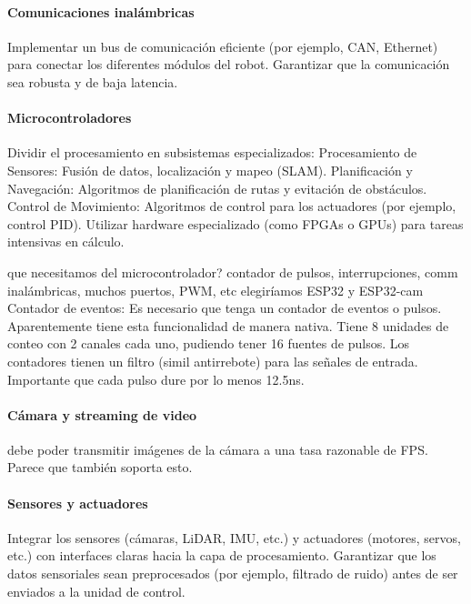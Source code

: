 \paragraph{Comunicaciones inalámbricas}

Implementar un bus de comunicación eficiente (por ejemplo, CAN, Ethernet) para conectar los diferentes módulos del robot. Garantizar que la comunicación sea robusta y de baja latencia.

\paragraph{Microcontroladores}

Dividir el procesamiento en subsistemas especializados:
    Procesamiento de Sensores: Fusión de datos, localización y mapeo (SLAM).
    Planificación y Navegación: Algoritmos de planificación de rutas y evitación de obstáculos.
    Control de Movimiento: Algoritmos de control para los actuadores (por ejemplo, control PID).
    Utilizar hardware especializado (como FPGAs o GPUs) para tareas intensivas en cálculo.

que necesitamos del microcontrolador? contador de pulsos, interrupciones, comm inalámbricas, muchos puertos, PWM, etc
elegiríamos ESP32 y ESP32-cam
Contador de eventos: Es necesario que tenga un contador de eventos o pulsos. Aparentemente tiene esta funcionalidad de manera nativa. Tiene 8 unidades de conteo con 2 canales cada uno, pudiendo tener 16 fuentes de pulsos. Los contadores tienen un filtro (simil antirrebote) para las señales de entrada. Importante que cada pulso dure por lo menos 12.5ns.

\paragraph{Cámara y streaming de video}

debe poder transmitir imágenes de la cámara a una tasa razonable de FPS. Parece que también soporta esto.

\paragraph{Sensores y actuadores}

Integrar los sensores (cámaras, LiDAR, IMU, etc.) y actuadores (motores, servos, etc.) con interfaces claras hacia la capa de procesamiento.
Garantizar que los datos sensoriales sean preprocesados (por ejemplo, filtrado de ruido) antes de ser enviados a la unidad de control.

